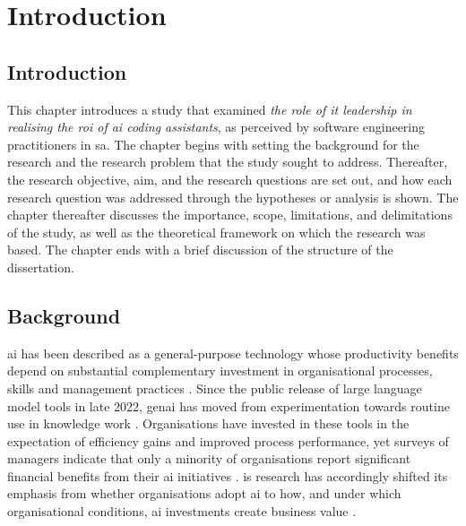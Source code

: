 \chapter{Introduction} %
\label{cha:ch1_introduction} %

\section{Introduction} 
\label{sec:Introduction} 
This chapter introduces a study that examined \emph{the role of \gls{it} leadership in realising the \gls{roi} of \gls{ai} coding assistants}, as perceived by software engineering practitioners in \gls{sa}. The chapter begins with setting the background for the research and the research problem that the study sought to address. Thereafter, the research objective, aim, and the research questions are set out, and how each research question was addressed through the hypotheses or analysis is shown. The chapter thereafter discusses the importance, scope, limitations, and delimitations of the study, as well as the theoretical framework on which the research was based. The chapter ends with a brief discussion of the structure of the dissertation.

\section{Background} 
\label{sec:Background} 

\gls{ai} has been described as a general-purpose technology whose productivity benefits depend on substantial complementary investment in organisational processes, skills and management practices \parencite{Brynjolfsson2021, Babina2024}. Since the public release of large language model tools in late 2022, \gls{genai} has moved from experimentation towards routine use in knowledge work \parencite{Gillespie2025, Hughes2026}. Organisations have invested in these tools in the expectation of efficiency gains and improved process performance, yet surveys of managers indicate that only a minority of organisations report significant financial benefits from their \gls{ai} initiatives \parencite{Ransbotham2020}. \gls{is} research has accordingly shifted its emphasis from whether organisations adopt \gls{ai} to how, and under which organisational conditions, \gls{ai} investments create business value \parencite{Enholm2022, Berente2021, Mikalef2021}.

